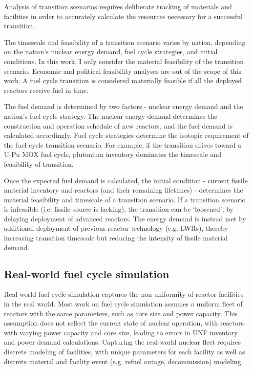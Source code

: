Analysis of transition scenarios requires
deliberate tracking of materials and facilities in order
to accurately calculate the resources necessary for a
successful transition.

The timescale and feasibility of a transition scenario
varies by nation, depending on the nation's nuclear energy demand,
fuel cycle strategies, and initial conditions.
In this work, I only consider the material feasibility of the
transition scenario. Economic and political feasibility analyses
are out of the scope of this work. A fuel cycle transition is considered
materially feasible if all the deployed reactors receive fuel
in time.

The fuel demand is determined by two factors - nuclear energy demand
and the nation's fuel cycle strategy.
The nuclear energy demand determines the construction
and operation
schedule of new reactors, and the fuel demand is
calculated accordingly.
Fuel cycle strategies determine the isotopic
requirement of the fuel cycle transition scenario. For example,
if the transition drives toward a U-Pu \gls{MOX} fuel cycle,
plutonium inventory dominates the timescale and feasibility of transition.

Once the expected fuel demand is calculated,
the initial condition - current fissile material inventory
and reactors (and their remaining lifetimes) - determines
the material feasibility and timescale of a transition scenario.
If a transition scenario is infeasible (i.e. fissile source is lacking),
the transition can be `loosened', by delaying deployment
of advanced reactors. The energy demand is instead met by additional
deployment of previous reactor technology (e.g. \glspl{LWR}),
thereby increasing transition timescale but reducing the
intensity of fissile material demand.

\subsection{Real-world fuel cycle simulation}
Real-world fuel cycle simulation captures the non-uniformity of
reactor facilities in the real world. Most work on fuel cycle
simulation assumes a uniform fleet of reactors with the same
parameters, such as core size and power capacity. This assumption
does not reflect the current state of nuclear operation, with
reactors with varying power capacity and core size, leading
to errors in \gls{UNF} inventory and power demand calculations.
Capturing the real-world nuclear fleet requires discrete
modeling of facilities, with unique parameters for each facility
as well as discrete material and facility event (e.g. refuel outage,
decommission) modeling.


